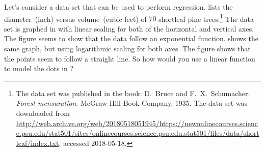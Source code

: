 \documentclass[a4paper,oneside,12pt]{article}
\begin{document}
Let's consider a data set that can be used to perform regression.
 lists the diameter~(inch) versus
volume~(cubic feet) of $70$ shortleaf pine trees.\footnote{
  The data set was published in the book:
  D.~Bruce and F.~X.~Schumacher.  \emph{Forest mensuration}.
  McGraw-Hill Book Company, 1935.
  The data set was downloaded from
  \url{http://web.archive.org/web/20180518051945/https://newonlinecourses.science.psu.edu/stat501/sites/onlinecourses.science.psu.edu.stat501/files/data/shortleaf/index.txt},
  accessed 2018-05-18.
}
The data set is graphed in 
with linear scaling for both of the horizontal and vertical axes.  The
figure seems to show that the data follow an exponential function.
 shows the same graph, but using
logarithmic scaling for both axes.  The figure shows that the points
seem to follow a straight line.  So how would you use a linear
function to model the dots in ?
\end{document}
